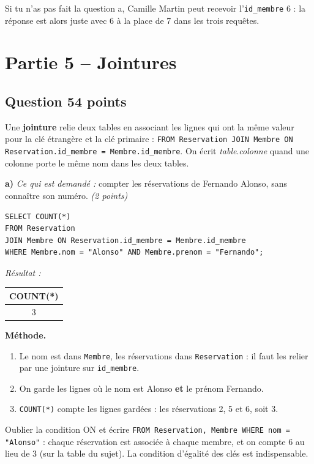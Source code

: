 \documentclass[11pt, a4paper]{exam}
\newcommand{\code}[1]{\texttt{#1}}
\newcommand{\Qt}[2]{\subsection*{#1\hfill{\normalfont\small #2}}}
\newcommand{\rappel}[1]{\noindent\textit{Ce qui est demandé :} #1\par\smallskip}
\newcommand{\methode}{\noindent\textbf{Méthode.}\ }
\newcommand{\sql}[1]{\textsc{#1}}
\newcommand{\resultat}[1]{\par\smallskip\noindent\textit{Résultat :}\par\nopagebreak\begin{center}\small #1\end{center}}
\begin{document}
\begin{remarque}
Si tu n'as pas fait la question a, Camille Martin peut recevoir l'\code{id\_membre} 6 : la réponse est alors juste avec 6 à la place de 7 dans les trois requêtes.
\end{remarque}

\section*{Partie 5 -- Jointures}
\Qt{Question 5}{4 points}

\begin{retenir}
Une \textbf{jointure} relie deux tables en associant les lignes qui ont la même valeur pour la clé étrangère et la clé primaire :
\code{FROM Reservation JOIN Membre ON Reservation.id\_membre = Membre.id\_membre}.
On écrit \textit{table}.\textit{colonne} quand une colonne porte le même nom dans les deux tables.
\end{retenir}

\textbf{a)} \rappel{compter les réservations de Fernando Alonso, sans connaître son numéro. \hfill\textit{(2 points)}}
\begin{reponse}
\begin{lstlisting}
SELECT COUNT(*)
FROM Reservation
JOIN Membre ON Reservation.id_membre = Membre.id_membre
WHERE Membre.nom = "Alonso" AND Membre.prenom = "Fernando";
\end{lstlisting}
\end{reponse}
\resultat{\begin{tabular}{|c|}\hline COUNT(*) \\\hline 3 \\\hline\end{tabular}}
\methode
\begin{enumerate}
\item Le nom est dans \code{Membre}, les réservations dans \code{Reservation} : il faut les relier par une jointure sur \code{id\_membre}.
\item On garde les lignes où le nom est Alonso \textbf{et} le prénom Fernando.
\item \code{COUNT(*)} compte les lignes gardées : les réservations 2, 5 et 6, soit 3.
\end{enumerate}

\begin{erreur}
Oublier la condition \sql{ON} et écrire \code{FROM Reservation, Membre WHERE nom = "Alonso"} : chaque réservation est associée à chaque membre, et on compte 6 au lieu de 3 (sur la table du sujet). La condition d'égalité des clés est indispensable.
\end{erreur}
\end{document}
